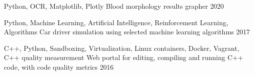

\begin{cventries}


\ifdefined\fullcv
      \cventry
        {Python, OCR, Matplotlib, Plotly} %
        {Blood morphology results grapher} %
        {} %
        {2020} %
        {
        }
\else
\fi

  \cventry
    {Python, Machine Learning, Artificial Intelligence, Reinforcement Learning, Algorithms} %
    {Car driver simulation using selected machine learning algorithms} %
    {} %
    {2017} %
    {
    }

\ifdefined\fullcv
      \cventry
        {C++, Python, Sandboxing, Virtualization, Linux containers, Docker, Vagrant, C++ quality measurement} %
        {Web portal for editing, compiling and running C++ code, with code quality metrics} %
        {} %
        {2016} %
        {
        }
\else
\fi

\end{cventries}
